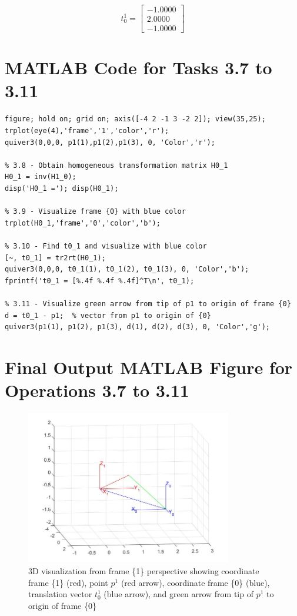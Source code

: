 \documentclass[11pt,a4paper]{article}
\begin{document}
$$t_0^1 = \begin{bmatrix} -1.0000 \\ 2.0000 \\ -1.0000 \end{bmatrix}$$

\section{MATLAB Code for Tasks 3.7 to 3.11}

\begin{lstlisting}[style=matlab, caption={MATLAB Code for Tasks 3.7-3.11}]
% 3.7 - New figure to visualize coordinate system {1} and p1
figure; hold on; grid on; axis([-4 2 -1 3 -2 2]); view(35,25);
trplot(eye(4),'frame','1','color','r');
quiver3(0,0,0, p1(1),p1(2),p1(3), 0, 'Color','r');

% 3.8 - Obtain homogeneous transformation matrix H0_1
H0_1 = inv(H1_0); 
disp('H0_1 ='); disp(H0_1);

% 3.9 - Visualize frame {0} with blue color
trplot(H0_1,'frame','0','color','b');

% 3.10 - Find t0_1 and visualize with blue color
[~, t0_1] = tr2rt(H0_1);
quiver3(0,0,0, t0_1(1), t0_1(2), t0_1(3), 0, 'Color','b'); 
fprintf('t0_1 = [%.4f %.4f %.4f]^T\n', t0_1);

% 3.11 - Visualize green arrow from tip of p1 to origin of frame {0}
d = t0_1 - p1;  % vector from p1 to origin of {0}
quiver3(p1(1), p1(2), p1(3), d(1), d(2), d(3), 0, 'Color','g');
\end{lstlisting}

\section{Final Output MATLAB Figure for Operations 3.7 to 3.11}

\begin{figure}[H]
    \centering
    \includegraphics[width=0.8\textwidth]{figure 2.jpg}
    \caption{3D visualization from frame \{1\} perspective showing coordinate frame \{1\} (red), point $p^1$ (red arrow), coordinate frame \{0\} (blue), translation vector $t_0^1$ (blue arrow), and green arrow from tip of $p^1$ to origin of frame \{0\}}
\end{figure}
\end{document}
